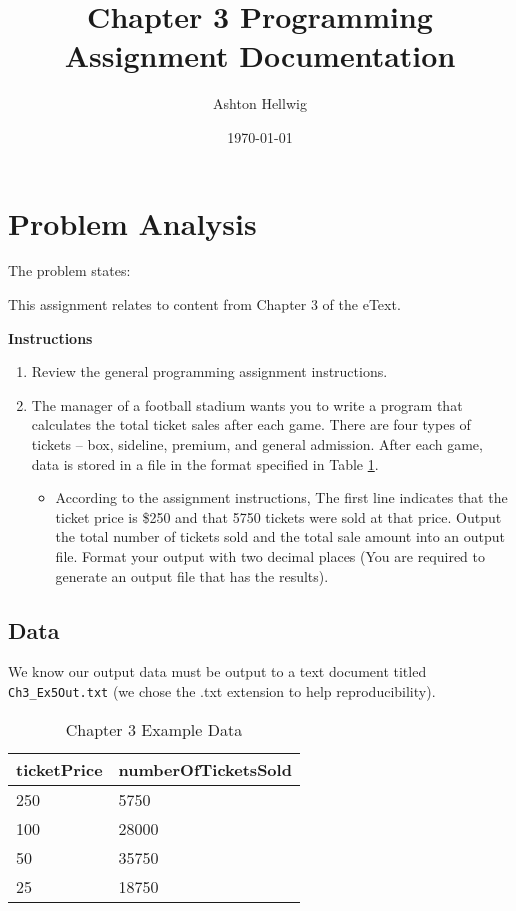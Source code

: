 \documentclass[a4paper, 11pt]{article}
\title{Chapter 3 Programming Assignment Documentation}
\author{Ashton Hellwig}
\date\today
\begin{document}
  \maketitle
  \tableofcontents
  \listofalgorithms
  \lstlistoflistings
  \listoftables
  \newpage


  \section{Problem Analysis}
    The problem states:
    \begin{mdframed}[backgroundcolor=green!20]
      This assignment relates to content from Chapter 3 of the eText.

      \textbf{Instructions}\vspace{-8pt}
      \begin{enumerate}
        \item Review the general programming assignment instructions.
        \item%
          The manager of a football stadium wants you to write a program
            that calculates the total ticket sales after each game. There are
            four types of tickets -- box, sideline, premium, and general
            admission. After each game, data is stored in a file in the format
            specified in Table \ref{pa:data}.
            \begin{itemize}
              \item According to the assignment instructions, The first line
                indicates that the ticket price is \$250 and that 5750 tickets
                were sold at that price. Output the total number of tickets sold
                and the total sale amount into an output file. Format your
                output with two decimal places (You are required to generate an
                output file that has the results).
            \end{itemize}
      \end{enumerate}
    \end{mdframed}

    \subsection{Data}
      We know our output data must be output to a text document titled
        \texttt{Ch3\_Ex5Out.txt} (we chose the .txt extension to help
        reproducibility).

      \begin{table}[h!]
        \begin{tabular}{ ||l|l|| }
          \hline
          ticketPrice &numberOfTicketsSold \\
          \hline\hline
          250 &5750 \\
          100 &28000 \\
          50  &35750 \\
          25  &18750 \\
          \hline
        \end{tabular}
        \centering
        \caption{Chapter 3 Example Data}
        \label{pa:data}
      \end{table}
\end{document}
